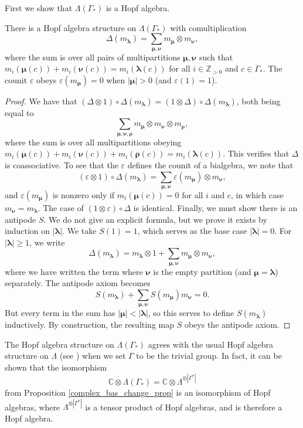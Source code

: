 \documentclass[ALCO,Unicode]{cedram}
\newcommand{\bs}{\boldsymbol}
\newcommand{\LambdaG}{\Lambda(\Gamma_*)}
\newcommand{\LambdaG}{\Lambda(\Gamma_*)}
\begin{document}
First we show that $\LambdaG$ is a Hopf algebra.
\begin{theorem}
There is a Hopf algebra structure on $\LambdaG$ with comultiplication
\[
\Delta(m_{\bs\lambda}) = \sum_{\bs\mu, \bs\nu} m_{\bs\mu} \otimes m_{\bs\nu},
\]
where the sum is over all pairs of multipartitions $\bs\mu, \bs\nu$ such that $m_i(\bs\mu(c)) + m_i(\bs\nu(c)) = m_i(\bs\lambda(c))$ for all $i \in \mathbb{Z}_{>0}$ and $c \in \Gamma_*$. The counit $\varepsilon$ obeys $\varepsilon(m_{\bs\mu}) = 0$ when $|\bs\mu| > 0$ \textup{(}and $\varepsilon(1) = 1$\textup{)}.
\end{theorem}
\begin{proof}
We have that $(\Delta \otimes 1) \circ \Delta (m_{\bs\lambda}) = (1 \otimes \Delta) \circ \Delta (m_{\bs\lambda})$, both being equal to
\[
\sum_{\bs\mu, \bs\nu,\bs\rho} m_{\bs\mu} \otimes m_{\bs\nu} \otimes m_{\bs\rho},
\]
where the sum is over all multipartitions obeying $m_i(\bs\mu(c)) + m_i(\bs\nu(c)) + m_i(\bs\rho(c)) = m_i(\bs\lambda(c))$. This verifies that $\Delta$ is coassociative. To see that the $\varepsilon$ defines the counit of a bialgebra, we note that 
\[
(\varepsilon \otimes 1) \circ \Delta (m_{\bs\lambda}) = \sum_{\bs\mu, \bs\nu} \varepsilon(m_{\bs\mu}) \otimes m_{\bs\nu},
\]
and $\varepsilon(m_{\bs\mu})$ is nonzero only if $m_i(\bs\mu(c)) = 0$ for all $i$ and $c$, in which case $m_{\bs\nu} = m_{\bs\lambda}$. The case of $(1 \otimes \varepsilon) \circ \Delta$ is identical. Finally, we must show there is an antipode $S$. We do not give an explicit formula, but we prove it exists by induction on $|\bs\lambda|$. We take $S(1) = 1$, which serves as the base case $|\bs\lambda| = 0$. For $|\bs\lambda| \geq 1$, we write
\[
\Delta(m_{\bs\lambda}) = m_{\bs\lambda} \otimes 1 + \sum_{\bs\mu,\bs\nu} m_{\bs\mu} \otimes m_{\bs\nu},
\]
where we have written the term where $\bs\nu$ is the empty partition (and $\bs\mu = \bs\lambda$) separately. The antipode axiom becomes
\[
S(m_{\bs\lambda}) + \sum_{\bs\mu, \bs\nu} S(m_{\bs\mu}) m_{\bs\nu} = 0.
\]
But every term in the sum has $|\bs\mu| < |\bs\lambda|$, so this serves to define $S(m_{\bs\lambda})$ inductively. By construction, the resulting map $S$ obeys the antipode axiom.
\end{proof}

\begin{remark}
The Hopf algebra structure on $\LambdaG$ agrees with the usual Hopf algebra structure on $\Lambda$ (see \cite[Section 1.5, Example 25]{Macdonald}) when we set $\Gamma$ to be the trivial group. In fact, it can be shown that the isomorphism
\[
\mathbb{C} \otimes \LambdaG = \mathbb{C} \otimes \Lambda^{\otimes |\Gamma^*|}
\]
from Proposition \ref{complex_bas_change_prop} is an isomorphism of Hopf algebras,  where $\Lambda^{\otimes |\Gamma^*|}$ is a tensor product of Hopf algebras, and is therefore a Hopf algebra.
\end{remark}
\end{document}
